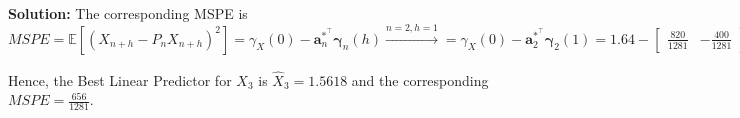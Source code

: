 \documentclass[11pt]{article}
\theoremstyle{plain} %
\newenvironment{solution}
{\color{C2}\normalfont\begin{framed}\begingroup\textbf{Solution:} }
  {\endgroup\end{framed}}
\theoremstyle{remark}
\newcommand{\EE}{\mathbb{E}}
\begin{document}
\begin{solution}
  The corresponding MSPE is
  $$
    MSPE = \EE\left[\left(X_{n+h}-P_{n} X_{n+h}\right)^{2}\right] = \gamma_{X}(0)- \mathbf{a}_n^{*^\top}\bm{\gamma}_n(h)
    \xrightarrow{n=2, h=1} =\gamma_{X}(0)- \mathbf{a}_2^{*^\top}\bm{\gamma}_2(1) = 1.64 - \begin{bmatrix}
      \frac{820}{1281} & -\frac{400}{1281}
    \end{bmatrix}\begin{bmatrix}
      0.8 \\
      0
    \end{bmatrix} = \frac{656}{1281}
  $$

  Hence, the Best Linear Predictor for $X_3$ is $\hat{X}_3= 1.5618$ and the corresponding $MSPE = \frac{656}{1281}$.
\end{solution}
\end{document}
